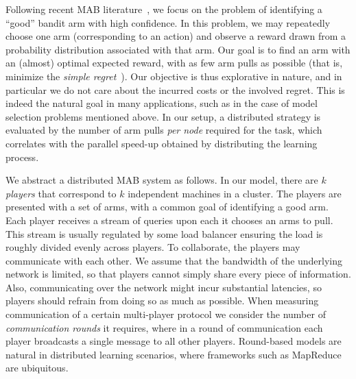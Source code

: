 \documentclass{article} %
\begin{document}
Following recent MAB literature~\cite{audibert10,evendar06}, we focus on the problem of identifying a ``good'' bandit arm with high confidence. 
In this problem, we may repeatedly choose one arm (corresponding to an action) and observe a reward drawn from a probability distribution associated with that arm.
Our goal is to find an arm with an (almost) optimal expected reward, with as few arm pulls as possible (that is, minimize the \emph{simple regret}~\cite{bubeck2009pure}).
Our objective is thus explorative in nature, and in particular we do not care about the incurred costs or the involved regret. 
This is indeed the natural goal in many applications, such as in the case of model selection problems mentioned above.
In our setup, a distributed strategy is evaluated by the number of arm pulls \emph{per node} required for the task, which correlates with the parallel speed-up obtained by distributing the learning process.

We abstract a distributed MAB system as follows.
In our model, there are $k$ \emph{players} that correspond to $k$ independent machines in a cluster. 
The players are presented with a set of arms, with a common goal of identifying a good arm.
Each player receives a stream of queries upon each it chooses an arms to pull. 
This stream is usually regulated by some load balancer ensuring the load is roughly divided evenly across players.
To collaborate, the players may communicate with each other.
We assume that the bandwidth of the underlying network is limited, so that players cannot simply share every piece of information.
Also, communicating over the network might incur substantial latencies, so players should refrain from doing so as much as possible. 
When measuring communication of a certain multi-player protocol we consider the number of \emph{communication rounds} it requires, where in a round of communication each player broadcasts a single message to all other players. 
Round-based models are natural in distributed learning scenarios, where frameworks such as MapReduce~\cite{MapReduce08} are ubiquitous.
\end{document}
